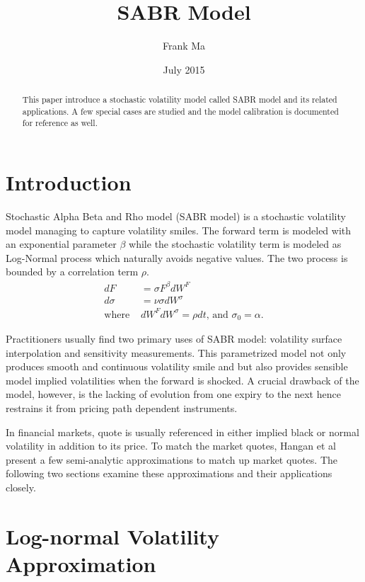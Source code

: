\documentclass{article}
\title{SABR Model}
\author{Frank Ma}
\date{July 2015}
\begin{document}
\maketitle

\begin{abstract}
    This paper introduce a stochastic volatility model called SABR model and its related applications.
    A few special cases are studied and the model calibration is documented for reference as well.
\end{abstract}

\section{Introduction}

Stochastic Alpha Beta and Rho model (SABR model) is a stochastic volatility model managing to capture volatility smiles.
The forward term is modeled with an exponential parameter $ \beta $ while the stochastic volatility term is modeled as Log-Normal process which naturally avoids negative values.
The two process is bounded by a correlation term $ \rho $.
\begin{align}
    d F &= \sigma F^{\beta} d W^F \\
    d \sigma &= \nu \sigma d W^{\sigma} \\
    \text{where } & d W^F d W^{\sigma} = \rho d t \text{, and } {\sigma}_0 = \alpha \text{.}\nonumber
\end{align}

Practitioners usually find two primary uses of SABR model: volatility surface interpolation and sensitivity measurements.
This parametrized model not only produces smooth and continuous volatility smile and but also provides sensible model implied volatilities when the forward is shocked.
A crucial drawback of the model, however, is the lacking of evolution from one expiry to the next hence restrains it from pricing path dependent instruments.

In financial markets, quote is usually referenced in either implied black or normal volatility in addition to its price.
To match the market quotes, Hangan et al \cite{Managing Smile Risk} present a few semi-analytic approximations to match up market quotes.
The following two sections examine these approximations and their applications closely.


\section{Log-normal Volatility Approximation}
\end{document}
